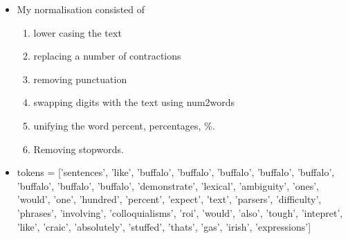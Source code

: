 \documentclass{scrreprt}
\begin{document}
\begin{enumerate}
\begin{itemize}
			\item My normalisation consisted of
			\begin{enumerate}
				\item lower casing the text
				\item replacing a number of contractions 
				\item removing punctuation 
				\item swapping digits with the text using num2words
				\item unifying the word percent, percentages, \%.
				\item Removing stopwords.
			\end{enumerate}
			\item tokens = ['sentences', 'like', 'buffalo', 'buffalo', 'buffalo', 'buffalo', 'buffalo', 'buffalo', 'buffalo', 'buffalo', 'demonstrate', 'lexical', 'ambiguity', 'ones', 'would', 'one', 'hundred', 'percent', 'expect', 'text', 'parsers', 'difficulty', 'phrases', 'involving', 'colloquialisms', 'roi', 'would', 'also', 'tough', 'intepret', 'like', 'craic', 'absolutely', 'stuffed', 'thats', 'gas', 'irish', 'expressions']
		\end{itemize}


\end{enumerate}
\end{document}
